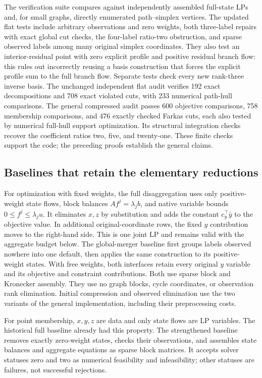 The verification suite compares against independently assembled full-state
LPs and, for small graphs, directly enumerated path--simplex vertices.
The updated flat tests include arbitrary observations and zero weights,
both three-label repairs with exact global cut checks, the four-label
ratio-two obstruction, and sparse observed labels among many original
simplex coordinates. They also test an interior-residual point with zero
explicit profile and positive residual branch flow: this rules out
incorrectly reusing a basis construction that forces the explicit profile
sum to the full branch flow. Separate tests check every new rank-three
inverse basis. The unchanged independent flat audit verifies 192 exact
decompositions and 708 exact violated cuts, with 233 numerical path-hull
comparisons. The general compressed audit passes 600 objective comparisons,
758 membership comparisons, and 476 exactly checked Farkas cuts, each also
tested by numerical full-hull support optimization. Its structural integration
checks recover the coefficient ratios two, five, and twenty-one. These finite
checks support the code; the preceding proofs establish the general claims.

\subsection{Baselines that retain the elementary reductions}

For optimization with fixed weights, the full disaggregation uses only
positive-weight state flows, block balances $Af^j=\lambda_j b$, and native
variable bounds $0\le f^j\le\lambda_j u$. It eliminates $x,z$ by substitution
and adds the constant $c_y^\top\bar y$ to the objective value. In additional
original-coordinate rows, the fixed $y$ contribution moves to the right-hand
side. This is one joint LP and remains valid with the aggregate budget below.
The global-merger baseline first groups labels observed nowhere into one
default, then applies the same construction to its positive-weight states.
With free weights, both interfaces retain every original $y$ variable and its
objective and constraint contributions. Both use sparse block and Kronecker
assembly. They use no graph blocks, cycle coordinates, or observation
rank elimination. Initial compression and observed elimination use the two
variants of the general implementation, including their preprocessing costs.

For point membership, $x,y,z$ are data and only state flows are LP variables.
The historical full baseline already had this property. The strengthened
baseline removes exactly zero-weight states, checks their observations, and
assembles state balances and aggregate equations as sparse block matrices.
It accepts solver statuses zero and two as numerical feasibility and
infeasibility; other statuses are failures, not successful rejections.

